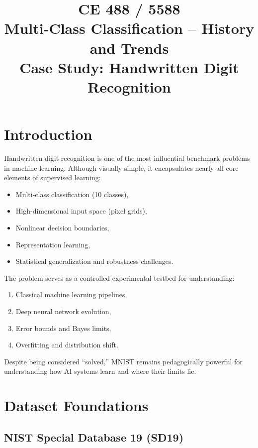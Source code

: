 \documentclass[11pt]{article}
\title{CE 488 / 5588 \\ Multi-Class Classification -- History and Trends \\ \large Case Study: Handwritten Digit Recognition}
\author{}
\date{}
\begin{document}
\maketitle
\newpage

\section{Introduction}

Handwritten digit recognition is one of the most influential benchmark problems in machine learning. 
Although visually simple, it encapsulates nearly all core elements of supervised learning:

\begin{itemize}
    \item Multi-class classification (10 classes),
    \item High-dimensional input space (pixel grids),
    \item Nonlinear decision boundaries,
    \item Representation learning,
    \item Statistical generalization and robustness challenges.
\end{itemize}

The problem serves as a controlled experimental testbed for understanding:
\begin{enumerate}
    \item Classical machine learning pipelines,
    \item Deep neural network evolution,
    \item Error bounds and Bayes limits,
    \item Overfitting and distribution shift.
\end{enumerate}

Despite being considered ``solved,'' MNIST remains pedagogically powerful for understanding how AI systems learn and where their limits lie.

\section{Dataset Foundations}

\subsection{NIST Special Database 19 (SD19)}
\end{document}
